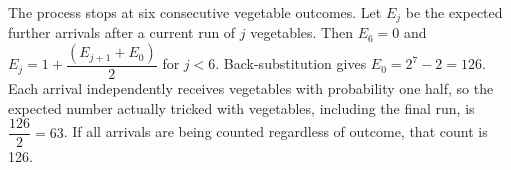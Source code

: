 The process stops at six consecutive vegetable outcomes. Let $E_j$ be the expected further arrivals after a current run of $j$ vegetables. Then $E_6=0$ and $E_j=1+\dfrac{(E_{j+1}+E_0)}{2}$ for $j<6$. Back-substitution gives $E_0=2^{7}-2=126$. Each arrival independently receives vegetables with probability one half, so the expected number actually tricked with vegetables, including the final run, is $\dfrac{126}{2}=\boxed{63}$. If all arrivals are being counted regardless of outcome, that count is 126.
